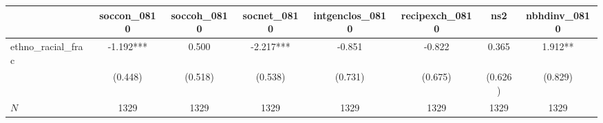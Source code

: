 {
\def\sym#1{\ifmmode^{#1}\else\(^{#1}\)\fi}
\begin{tabular}{l*{7}{c}}
\toprule
          &\multicolumn{1}{c}{soccon\_0810}&\multicolumn{1}{c}{soccoh\_0810}&\multicolumn{1}{c}{socnet\_0810}&\multicolumn{1}{c}{intgenclos\_0810}&\multicolumn{1}{c}{recipexch\_0810}&\multicolumn{1}{c}{ns2}&\multicolumn{1}{c}{nbhdinv\_0810}\\
\midrule
ethno\_racial\_frac&   -1.192***&    0.500   &   -2.217***&   -0.851   &   -0.822   &    0.365   &    1.912** \\
          &  (0.448)   &  (0.518)   &  (0.538)   &  (0.731)   &  (0.675)   &  (0.626)   &  (0.829)   \\
\midrule
\(N\)     &     1329   &     1329   &     1329   &     1329   &     1329   &     1329   &     1329   \\
\bottomrule
\end{tabular}
}

